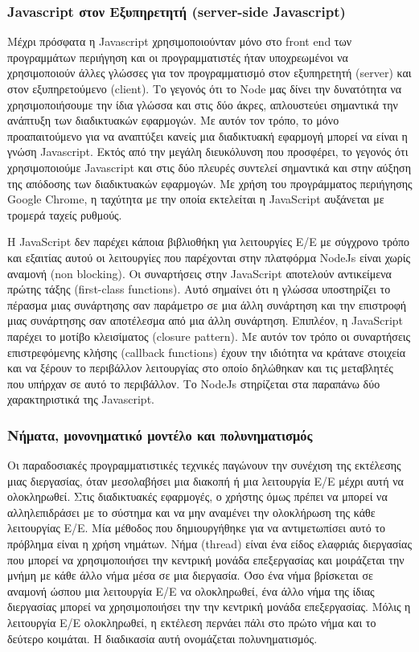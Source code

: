 \subsubsection{Javascript στον Εξυπηρετητή (server-side Javascript)}

 
 Μέχρι πρόσφατα η Javascript χρησιμοποιούνταν μόνο στο front end των προγραμμάτων περιήγηση και οι προγραμματιστές ήταν υποχρεωμένοι να χρησιμοποιούν άλλες γλώσσες για τον προγραμματισμό στον εξυπηρετητή (server) και στον εξυπηρετούμενο (client). Το γεγονός ότι το Node μας δίνει την δυνατότητα να χρησιμοποιήσουμε την ίδια γλώσσα και στις δύο άκρες, απλουστεύει σημαντικά την ανάπτυξη των διαδικτυακών εφαρμογών.  Με αυτόν τον τρόπο, το μόνο προαπαιτούμενο για να αναπτύξει κανείς μια διαδικτυακή εφαρμογή μπορεί να είναι η γνώση Javascript. Εκτός από την μεγάλη διευκόλυνση που προσφέρει, το γεγονός ότι χρησιμοποιούμε Javascript και στις δύο πλευρές συντελεί σημαντικά και στην αύξηση της απόδοσης των διαδικτυακών εφαρμογών. Με χρήση του προγράμματος περιήγησης Google Chrome, η ταχύτητα με την οποία εκτελείται η JavaScript αυξάνεται με τρομερά ταχείς ρυθμούς.

Η JavaScript δεν παρέχει κάποια βιβλιοθήκη για λειτουργίες Ε/Ε με σύγχρονο τρόπο και εξαιτίας αυτού  οι λειτουργίες που παρέχονται στην πλατφόρμα NodeJs είναι χωρίς αναμονή (non blocking). Οι συναρτήσεις στην JavaScript αποτελούν αντικείμενα πρώτης τάξης (first-class functions). Αυτό σημαίνει ότι η γλώσσα υποστηρίζει το πέρασμα μιας συνάρτησης σαν παράμετρο σε μια άλλη συνάρτηση και την επιστροφή μιας συνάρτησης σαν αποτέλεσμα από μια άλλη συνάρτηση. Επιπλέον, η JavaScript παρέχει το μοτίβο κλεισίματος (closure pattern). Με αυτόν τον τρόπο οι συναρτήσεις επιστρεφόμενης κλήσης (callback functions) έχουν την ιδιότητα να κράτανε στοιχεία και να ξέρουν το περιβάλλον λειτουργίας στο οποίο δηλώθηκαν και τις μεταβλητές που υπήρχαν σε αυτό το περιβάλλον.  Το NodeJs στηρίζεται στα παραπάνω δύο χαρακτηριστικά της Javascript.

\subsubsection{Νήματα, μονονηματικό μοντέλο και πολυνηματισμός}


		Οι παραδοσιακές προγραμματιστικές τεχνικές παγώνουν την συνέχιση της εκτέλεσης μιας διεργασίας, όταν μεσολαβήσει μια διακοπή ή μια λειτουργία E/E μέχρι αυτή να ολοκληρωθεί. Στις διαδικτυακές εφαρμογές, ο χρήστης όμως πρέπει να μπορεί να αλληλεπιδράσει με το σύστημα και να μην αναμένει την ολοκλήρωση της κάθε λειτουργίας Ε/Ε. Μία μέθοδος που δημιουργήθηκε για να αντιμετωπίσει αυτό το πρόβλημα είναι η χρήση νημάτων. Νήμα (thread) είναι ένα είδος ελαφριάς διεργασίας που μπορεί να χρησιμοποιήσει την κεντρική μονάδα επεξεργασίας και μοιράζεται την μνήμη με κάθε άλλο νήμα μέσα σε μια διεργασία. Όσο ένα νήμα βρίσκεται σε αναμονή ώσπου μια λειτουργία Ε/Ε να ολοκληρωθεί, ένα άλλο νήμα της ίδιας διεργασίας μπορεί να χρησιμοποιήσει την την κεντρική μονάδα επεξεργασίας. Μόλις η λειτουργία Ε/Ε ολοκληρωθεί, η εκτέλεση περνάει πάλι στο πρώτο νήμα και το δεύτερο κοιμάται. Η διαδικασία αυτή ονομάζεται πολυνηματισμός.
		
